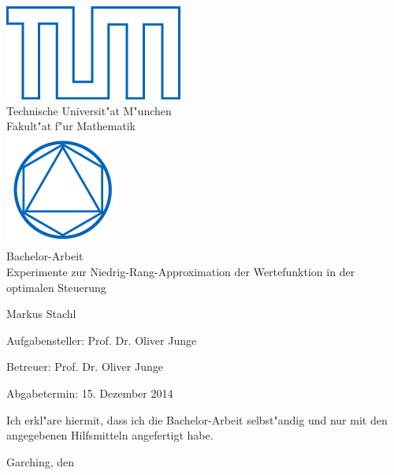 \documentclass[12pt,a4paper,twoside]{article}
\begin{document}
\pagestyle{empty}
\begin{titlepage}
\begin{center}
\includegraphics{TUMblau.png}\\[3mm]
\sf
{\Large
  Technische Universit"at M"unchen\\[5mm]
  Fakult"at f"ur Mathematik\\[8mm]
}
\normalsize
\includegraphics{MA_Web.png}\\[15mm]

Bachelor-Arbeit\\[15mm]

{\LARGE
Experimente zur Niedrig-Rang-Approximation der Wertefunktion in der optimalen Steuerung
}
\bigskip

\normalsize

Markus Stachl
\end{center}
\vspace*{75mm}

Aufgabensteller: Prof. Dr. Oliver Junge
\medskip

Betreuer: Prof. Dr. Oliver Junge
\medskip

Abgabetermin: 15. Dezember 2014

\end{titlepage}

\vspace*{150mm}

Ich erkl"are hiermit, dass ich die Bachelor-Arbeit selbst"andig und nur mit den angegebenen
Hilfsmitteln angefertigt habe.
\bigskip

Garching, den
\newpage
\end{document}
